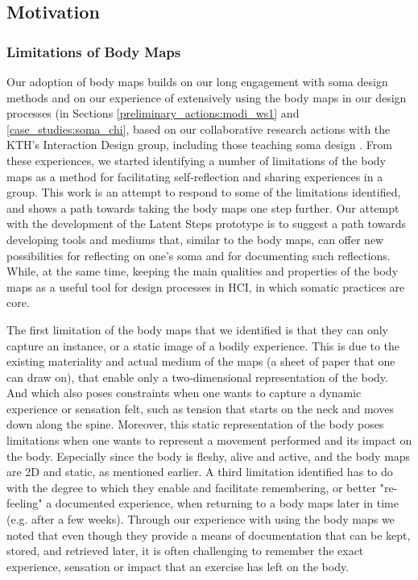 
\subsection{Motivation}

\subsubsection{Limitations of Body Maps}

Our adoption of body maps builds on our long engagement with soma design methods and on our experience of extensively using the body maps in our design processes (in Sections \ref{preliminary_actions:modi_ws1} and \ref{case_studies:soma_chi}, based on our collaborative research actions with the KTH's Interaction Design group, including those teaching soma design \cite{tsaknaki_teaching_2019}. From these experiences, we started identifying a number of limitations of the body maps as a method for facilitating self-reflection and sharing experiences in a group. This work is an attempt to respond to some of the limitations identified, and shows a path towards taking the body maps one step further. Our attempt with the development of the Latent Steps prototype is to suggest a path towards developing tools and mediums that, similar to the body maps, can offer new possibilities for reflecting on one's soma and for documenting such reflections. While, at the same time, keeping the main qualities and properties of the body maps as a useful tool for design processes in HCI, in which somatic practices are core.

The first limitation of the body maps that we identified is that they can only capture an instance, or a static image of a bodily experience. This is due to the existing materiality and actual medium of the maps (a sheet of paper that one can draw on), that enable only a two-dimensional representation of the body. And which also poses constraints when one wants to capture a dynamic experience or sensation felt, such as tension that starts on the neck and moves down along the spine. Moreover, this static representation of the body poses limitations when one wants to represent a movement performed and its impact on the body. Especially since the body is fleshy, alive and active, and the body maps are 2D and static, as mentioned earlier. A third limitation identified has to do with the degree to which they enable and facilitate remembering, or better "re-feeling" a documented experience, when returning to a body maps later in time (e.g. after a few weeks). Through our experience with using the body maps we noted that even though they provide a means of documentation that can be kept, stored, and retrieved later, it is often challenging to remember the exact experience, sensation or impact that an exercise has left on the body.

